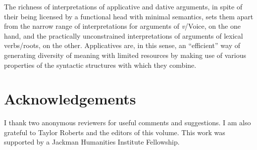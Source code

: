 \documentclass[output=paper,colorlinks,citecolor=brown,nonflat]{./langscibook}
\begin{document}
The richness of interpretations of applicative and dative arguments, in spite of their being licensed by a functional head with minimal semantics, sets them apart from the narrow range of interpretations for arguments of \textit{v}/Voice, on the one hand, and the practically unconstrained interpretations of arguments of lexical verbs/roots, on the other. Applicatives are, in this sense, an “efficient” way of generating diversity of meaning with limited resources by making use of various properties of the syntactic structures with which they combine.

\section*{Acknowledgements}

I thank two anonymous reviewers for useful comments and suggestions. I am also grateful to Taylor Roberts and the editors of this volume. This work was supported by a Jackman Humanities Institute Fellowship.

\sloppy\printbibliography[heading=subbibliography,notkeyword=this]
\end{document}
